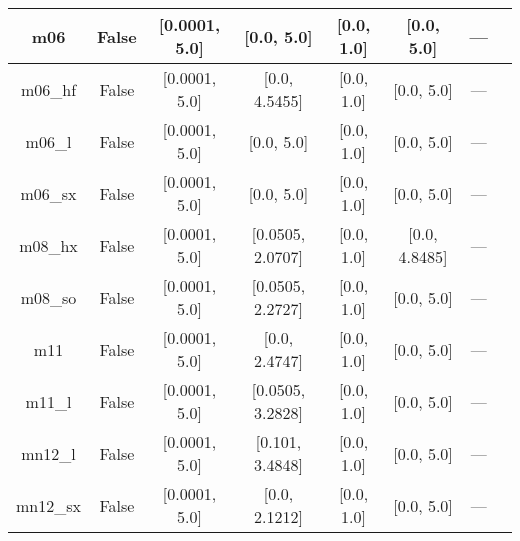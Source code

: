 \begin{tabular}{|c|c|c|c|c|c|c|l|}
           m06 &                 False &     [0.0001, 5.0] &        [0.0, 5.0] &        [0.0, 1.0] &     [0.0, 5.0] &        --- &                                                                 \cite{Zhao2008_215} \\ \hline
       m06\_hf &                 False &     [0.0001, 5.0] &     [0.0, 4.5455] &        [0.0, 1.0] &     [0.0, 5.0] &        --- &                                                               \cite{Zhao2006_13126} \\ \hline
        m06\_l &                 False &     [0.0001, 5.0] &        [0.0, 5.0] &        [0.0, 1.0] &     [0.0, 5.0] &        --- &                                                 \cite{Zhao2006_194101,Zhao2008_215} \\ \hline
       m06\_sx &                 False &     [0.0001, 5.0] &        [0.0, 5.0] &        [0.0, 1.0] &     [0.0, 5.0] &        --- &                                                                \cite{Wang2020_2294} \\ \hline
       m08\_hx &                 False &     [0.0001, 5.0] &  [0.0505, 2.0707] &        [0.0, 1.0] &  [0.0, 4.8485] &        --- &                                                                \cite{Zhao2008_1849} \\ \hline
       m08\_so &                 False &     [0.0001, 5.0] &  [0.0505, 2.2727] &        [0.0, 1.0] &     [0.0, 5.0] &        --- &                                                                \cite{Zhao2008_1849} \\ \hline
           m11 &                 False &     [0.0001, 5.0] &     [0.0, 2.4747] &        [0.0, 1.0] &     [0.0, 5.0] &        --- &                                                            \cite{Peverati2011_2810} \\ \hline
        m11\_l &                 False &     [0.0001, 5.0] &  [0.0505, 3.2828] &        [0.0, 1.0] &     [0.0, 5.0] &        --- &                                                             \cite{Peverati2012_117} \\ \hline
       mn12\_l &                 False &     [0.0001, 5.0] &   [0.101, 3.4848] &        [0.0, 1.0] &     [0.0, 5.0] &        --- &                                                           \cite{Peverati2012_13171} \\ \hline
      mn12\_sx &                 False &     [0.0001, 5.0] &     [0.0, 2.1212] &        [0.0, 1.0] &     [0.0, 5.0] &        --- &                                                           \cite{Peverati2012_16187} \\ \hline

\end{tabular}
